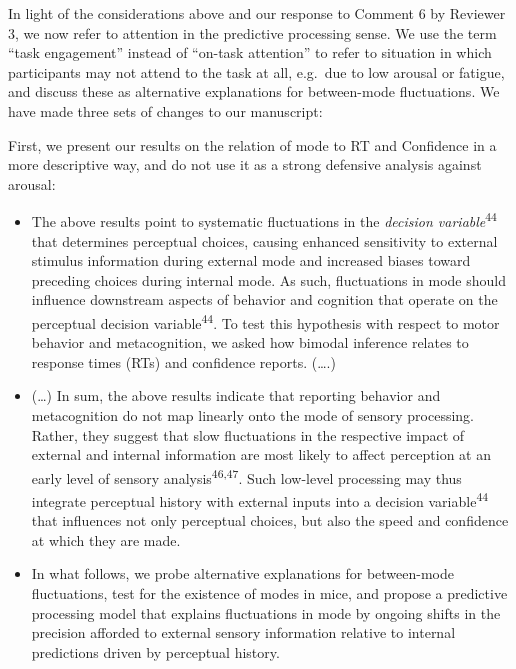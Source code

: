 \documentclass[
]{article}
\begin{document}
In light of the considerations above and our response to Comment 6 by
Reviewer 3, we now refer to attention in the predictive processing
sense. We use the term ``task engagement'' instead of ``on-task
attention'' to refer to situation in which participants may not attend
to the task at all, e.g.~due to low arousal or fatigue, and discuss
these as alternative explanations for between-mode fluctuations. We have
made three sets of changes to our manuscript:

First, we present our results on the relation of mode to RT and
Confidence in a more descriptive way, and do not use it as a strong
defensive analysis against arousal:

\begin{itemize}
\item
  The above results point to systematic fluctuations in the
  \emph{decision variable}\textsuperscript{44} that determines
  perceptual choices, causing enhanced sensitivity to external stimulus
  information during external mode and increased biases toward preceding
  choices during internal mode. As such, fluctuations in mode should
  influence downstream aspects of behavior and cognition that operate on
  the perceptual decision variable\textsuperscript{44}. To test this
  hypothesis with respect to motor behavior and metacognition, we asked
  how bimodal inference relates to response times (RTs) and confidence
  reports. (\ldots.)
\item
  (\ldots) In sum, the above results indicate that reporting behavior
  and metacognition do not map linearly onto the mode of sensory
  processing. Rather, they suggest that slow fluctuations in the
  respective impact of external and internal information are most likely
  to affect perception at an early level of sensory
  analysis\textsuperscript{46,47}. Such low-level processing may thus
  integrate perceptual history with external inputs into a decision
  variable\textsuperscript{44} that influences not only perceptual
  choices, but also the speed and confidence at which they are made.
\item
  In what follows, we probe alternative explanations for between-mode
  fluctuations, test for the existence of modes in mice, and propose a
  predictive processing model that explains fluctuations in mode by
  ongoing shifts in the precision afforded to external sensory
  information relative to internal predictions driven by perceptual
  history.
\end{itemize}
\end{document}
